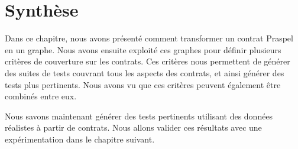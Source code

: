 \section{Synthèse}
\label{section:test:summary}

Dans ce chapitre, nous avons présenté comment transformer un contrat Praspel en
un graphe. Nous avons ensuite exploité ces graphes pour définir plusieurs
critères de couverture sur les contrats. Ces critères nous permettent de générer
des suites de tests couvrant tous les aspects des contrats, et ainsi générer des
tests plus pertinents. Nous avons vu que ces critères peuvent également être
combinés entre eux.

Nous savons maintenant générer des tests pertinents utilisant des données
réalistes à partir de contrats. Nous allons valider ces résultats avec une
expérimentation dans le chapitre suivant.
